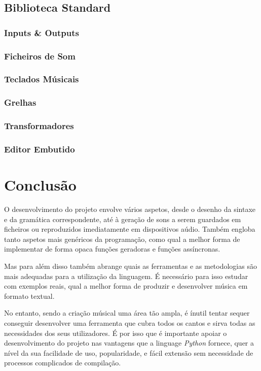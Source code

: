 \documentclass[
  oneside,
  11pt, a4paper,
  footinclude=true,
  headinclude=true,
  cleardoublepage=empty
]{scrbook}
\begin{document}
	\section{Biblioteca Standard}
	\subsection{Inputs \& Outputs}
	\subsection{Ficheiros de Som}
	\subsection{Teclados Músicais}
	\subsection{Grelhas}
	\subsection{Transformadores}
	\subsection{Editor Embutido}
	

	\chapter{Conclusão}
	O desenvolvimento do projeto envolve vários aspetos, desde o desenho da sintaxe e da gramática correspondente, até à geração de sons a serem guardados em ficheiros ou reproduzidos imediatamente em dispositivos aúdio. Também engloba tanto aspetos mais genéricos da programação, como qual a melhor forma de implementar de forma opaca funções geradoras e funções assíncronas.
	
	Mas para além disso também abrange quais as ferramentas e as metodologias são mais adequadas para a utilização da linguagem. É necessário para isso estudar com exemplos reais, qual a melhor forma de produzir e desenvolver música em formato textual.
	
	No entanto, sendo a criação músical uma área tão ampla, é ínutil tentar sequer conseguir desenvolver uma ferramenta que cubra todos os cantos e sirva todas as necessidades dos seus utilizadores. É por isso que é importante apoiar o desenvolvimento do projeto nas vantagens que a linguage \textit{Python} fornece, quer a nível da sua facilidade de uso, popularidade, e fácil extensão sem necessidade de processos complicados de compilação.
	
\end{document}
